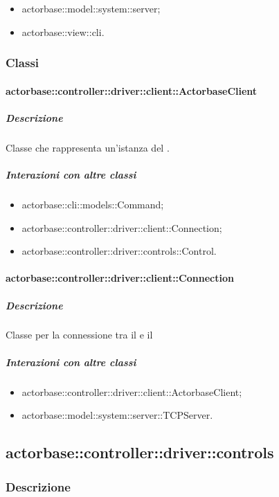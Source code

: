 \documentclass{scalatekids-article}
\begin{document}
\begin{itemize}
\item actorbase::model::system::server;
\item actorbase::view::cli.%
\end{itemize}

\subsubsection{Classi}

\paragraph{actorbase::controller::driver::client::ActorbaseClient}

\subparagraph{Descrizione}

Classe che rappresenta un'istanza del .

\subparagraph{Interazioni con altre classi}

\begin{itemize}
\item actorbase::cli::models::Command;
\item actorbase::controller::driver::client::Connection;
\item actorbase::controller::driver::controls::Control.
\end{itemize}

\paragraph{actorbase::controller::driver::client::Connection}

\subparagraph{Descrizione}

Classe per la connessione tra il  e il 

\subparagraph{Interazioni con altre classi}
\begin{itemize}
\item actorbase::controller::driver::client::ActorbaseClient;
\item actorbase::model::system::server::TCPServer.
\end{itemize}

\subsection{actorbase::controller::driver::controls}

\subsubsection{Descrizione}
\end{document}
